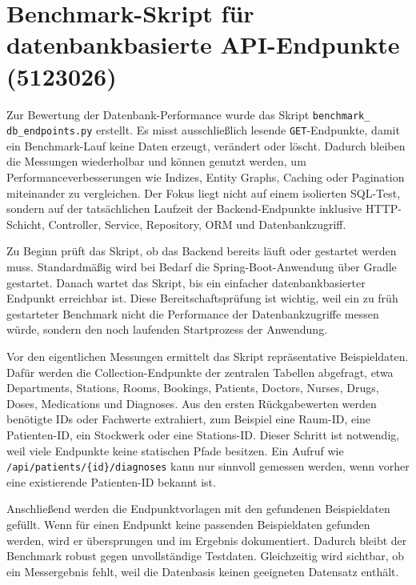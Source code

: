 \section{Benchmark-Skript für datenbankbasierte API-Endpunkte \\(5123026)}
\label{sec:benchmark_script}

Zur Bewertung der Datenbank-Performance wurde das Skript \texttt{benchmark\_} \texttt{db\_endpoints.py} erstellt. Es misst ausschließlich lesende \texttt{GET}-Endpunkte, damit ein Benchmark-Lauf keine Daten erzeugt, verändert oder löscht. Dadurch bleiben die Messungen wiederholbar und können genutzt werden, um Performanceverbesserungen wie Indizes, Entity Graphs, Caching oder Pagination miteinander zu vergleichen. Der Fokus liegt nicht auf einem isolierten SQL-Test, sondern auf der tatsächlichen Laufzeit der Backend-Endpunkte inklusive HTTP-Schicht, Controller, Service, Repository, ORM und Datenbankzugriff.

Zu Beginn prüft das Skript, ob das Backend bereits läuft oder gestartet werden muss. Standardmäßig wird bei Bedarf die Spring-Boot-Anwendung über Gradle gestartet. Danach wartet das Skript, bis ein einfacher datenbankbasierter Endpunkt erreichbar ist. Diese Bereitschaftsprüfung ist wichtig, weil ein zu früh gestarteter Benchmark nicht die Performance der Datenbankzugriffe messen würde, sondern den noch laufenden Startprozess der Anwendung.

Vor den eigentlichen Messungen ermittelt das Skript repräsentative Beispieldaten. Dafür werden die Collection-Endpunkte der zentralen Tabellen abgefragt, etwa Departments, Stations, Rooms, Bookings, Patients, Doctors, Nurses, Drugs, Doses, Medications und Diagnoses. Aus den ersten Rückgabewerten werden benötigte IDs oder Fachwerte extrahiert, zum Beispiel eine Raum-ID, eine Patienten-ID, ein Stockwerk oder eine Stations-ID. Dieser Schritt ist notwendig, weil viele Endpunkte keine statischen Pfade besitzen. Ein Aufruf wie \texttt{/api/patients/\{id\}/diagnoses} kann nur sinnvoll gemessen werden, wenn vorher eine existierende Patienten-ID bekannt ist.

Anschließend werden die Endpunktvorlagen mit den gefundenen Beispieldaten gefüllt. Wenn für einen Endpunkt keine passenden Beispieldaten gefunden werden, wird er übersprungen und im Ergebnis dokumentiert. Dadurch bleibt der Benchmark robust gegen unvollständige Testdaten. Gleichzeitig wird sichtbar, ob ein Messergebnis fehlt, weil die Datenbasis keinen geeigneten Datensatz enthält.

